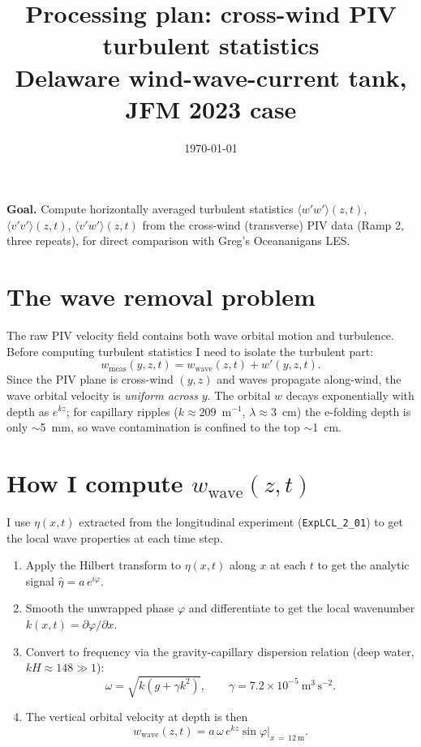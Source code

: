 \documentclass[11pt]{article}
\title{\textbf{Processing plan: cross-wind PIV turbulent statistics}\\[4pt]
       \large Delaware wind-wave-current tank, JFM 2023 case}
\author{}
\date{\today}
\newcommand{\avg}[1]{\langle #1 \rangle}
\begin{document}
\maketitle
\thispagestyle{empty}

\textbf{Goal.} Compute horizontally averaged turbulent statistics
$\avg{w'w'}(z,t)$, $\avg{v'v'}(z,t)$, $\avg{v'w'}(z,t)$
from the cross-wind (transverse) PIV data (Ramp 2, three repeats),
for direct comparison with Greg's Oceananigans LES.

\section*{The wave removal problem}

The raw PIV velocity field contains both wave orbital motion and turbulence.
Before computing turbulent statistics I need to isolate the turbulent part:
\[
  w_\text{meas}(y,z,t) = w_\text{wave}(z,t) + w'(y,z,t).
\]
Since the PIV plane is cross-wind $(y,z)$ and waves propagate along-wind,
the wave orbital velocity is \emph{uniform across} $y$.
The orbital $w$ decays exponentially with depth as $e^{kz}$; for
capillary ripples ($k \approx 209$~m$^{-1}$, $\lambda \approx 3$~cm)
the e-folding depth is only $\sim$5~mm, so wave contamination is
confined to the top $\sim$1~cm.

\section*{How I compute $w_\text{wave}(z,t)$}

I use $\eta(x,t)$ extracted from the longitudinal experiment
(\texttt{ExpLCL\_2\_01}) to get the local wave properties at each time step.

\begin{enumerate}
  \item Apply the Hilbert transform to $\eta(x,t)$ along $x$ at each $t$
        to get the analytic signal $\hat\eta = a\,e^{i\varphi}$.
  \item Smooth the unwrapped phase $\varphi$ and differentiate to get the
        local wavenumber $k(x,t) = \partial\varphi/\partial x$.
  \item Convert to frequency via the gravity-capillary dispersion relation
        (deep water, $kH \approx 148 \gg 1$):
        \[
          \omega = \sqrt{k(g + \gamma k^2)}, \qquad
          \gamma = 7.2\times10^{-5}~\text{m}^3\,\text{s}^{-2}.
        \]
  \item The vertical orbital velocity at depth is then
        \[
          w_\text{wave}(z,t) = a\,\omega\,e^{kz}\sin\varphi
          \Big|_{x\,=\,12~\text{m}}.
        \]
\end{enumerate}
\end{document}
